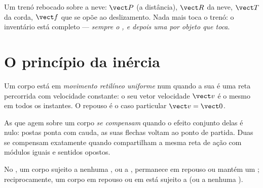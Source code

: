 \begin{example}\label{ex:g10:inertia:sled}
Um trenó rebocado sobre a neve:  $\vect P$ (a distância),  $\vect R$ da neve,  $\vect T$ da corda,  $\vect f$ que
se opõe ao deslizamento. Nada mais toca o trenó: o inventário está
completo --- \emph{sempre o , e depois uma  por
objeto que toca}.
\end{example}

\section{O princípio da inércia}

\begin{definition}\label{def:g10:inertia:uniform}
Um corpo está em \emph{movimento retilíneo uniforme} num  quando a sua  é uma reta
percorrida com velocidade constante: o seu vetor velocidade $\vect v$ é o
mesmo em todos os instantes. O repouso é o caso particular
$\vect v = \vect 0$.
\end{definition}

\begin{definition}\label{def:g10:inertia:compensate}
As  que agem sobre um corpo \emph{se compensam} quando o efeito conjunto delas é nulo: postas ponta com cauda,
as suas flechas voltam ao ponto de partida. Duas  se compensam
exatamente quando compartilham a mesma reta de ação com módulos iguais e
sentidos opostos.
\end{definition}

\begin{theorem}\label{thm:g10:inertia:principle}
No , um corpo sujeito a nenhuma , ou a , permanece em repouso ou mantém um ; reciprocamente, um corpo em repouso ou em  está sujeito a  (ou a nenhuma ).
\end{theorem}
\admitted

